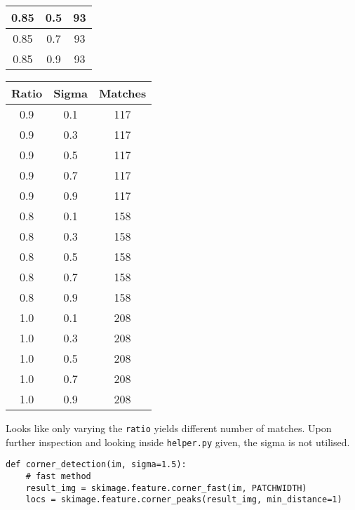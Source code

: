 \documentclass[12pt,letterpaper, onecolumn]{exam}
\begin{document}
\begin{questions}
\begin{solution}
\begin{center}
\begin{tabular}{|c|c|c|}
                \hline
                0.85 & 0.5 & 93 \\
                \hline
                0.85 & 0.7 & 93 \\
                \hline
                0.85 & 0.9 & 93 \\
                \hline
            \end{tabular}
            \quad
            \begin{tabular}{|c|c|c|}
                \hline
                \textbf{Ratio} & \textbf{Sigma} & \textbf{Matches} \\
                \hline
                0.9 & 0.1 & 117 \\
                \hline
                0.9 & 0.3 & 117 \\
                \hline
                0.9 & 0.5 & 117 \\
                \hline
                0.9 & 0.7 & 117 \\
                \hline
                0.9 & 0.9 & 117 \\
                \hline
                0.8 & 0.1 & 158 \\
                \hline
                0.8 & 0.3 & 158 \\
                \hline
                0.8 & 0.5 & 158 \\
                \hline
                0.8 & 0.7 & 158 \\
                \hline
                0.8 & 0.9 & 158 \\
                \hline
                1.0 & 0.1 & 208 \\
                \hline
                1.0 & 0.3 & 208 \\
                \hline
                1.0 & 0.5 & 208 \\
                \hline
                1.0 & 0.7 & 208 \\
                \hline
                1.0 & 0.9 & 208 \\
                \hline
            \end{tabular}
        \end{center}
        Looks like only varying the \texttt{ratio} yields different number of matches. Upon further inspection and looking inside \texttt{helper.py} given, the sigma is not utilised.
        \begin{verbatim}
def corner_detection(im, sigma=1.5):
    # fast method
    result_img = skimage.feature.corner_fast(im, PATCHWIDTH)
    locs = skimage.feature.corner_peaks(result_img, min_distance=1)

\end{verbatim}
\end{solution}
\end{questions}
\end{document}
